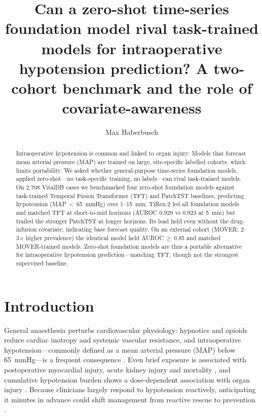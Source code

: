 \documentclass[11pt]{article}
\title{\textbf{Can a zero-shot time-series foundation model rival
task-trained models for intraoperative hypotension prediction? A two-cohort
benchmark and the role of covariate-awareness}}
\author[1,2]{Max Haberbusch}
\affil[1]{Center for Medical Physics and Biomedical Engineering, Medical University of Vienna, Vienna, Austria}
\affil[2]{Ludwig Boltzmann Institute for Cardiovascular Research, Vienna, Austria}
\affil[ ]{\normalfont Correspondence: \texttt{max.haberbusch@meduniwien.ac.at}}
\date{}
\begin{document}
\maketitle

\begin{abstract}
\noindent
Intraoperative hypotension is common and linked to organ injury. Models that
forecast mean arterial pressure (MAP) are trained on large, site-specific
labelled cohorts, which limits portability. We asked whether general-purpose
time-series foundation models, applied zero-shot---no task-specific training,
no labels---can rival task-trained models. On 2{,}708 VitalDB cases we
benchmarked four zero-shot foundation models against task-trained Temporal
Fusion Transformer (TFT) and PatchTST baselines, predicting hypotension
(MAP\,$<$\,65~mmHg) over 1--15~min. TiRex-2 led all foundation models and
matched TFT at short-to-mid horizons (AUROC 0.929 vs 0.923 at 5~min) but
trailed the stronger PatchTST at longer horizons. Its lead held even without
the drug-infusion covariate, indicating base forecast quality. On an external
cohort (MOVER; 2--3$\times$ higher prevalence) the identical model held
AUROC\,$\geq$\,0.85 and matched MOVER-trained models. Zero-shot foundation
models are thus a portable alternative for intraoperative hypotension
prediction---matching TFT, though not the strongest supervised baseline.
\end{abstract}

\section{Introduction}

General anaesthesia perturbs cardiovascular physiology: hypnotics and
opioids reduce cardiac inotropy and systemic vascular resistance, and
intraoperative hypotension---commonly defined as a mean arterial pressure
(MAP) below 65~mmHg---is a frequent consequence \citep{Kapral2024,Zhu2026}.
Even brief exposure is associated with postoperative myocardial injury,
acute kidney injury and mortality
\citep{Walsh2013,Salmasi2017,Sun2015,Mascha2015,SesslerKhanna2018}, and
cumulative hypotension burden shows a dose-dependent association with organ
injury \citep{Zhu2026}. Because clinicians largely respond to hypotension
reactively, anticipating it minutes in advance could shift management from
reactive rescue to prevention \citep{Sessler2019,Wijnberge2020}.
\end{document}
